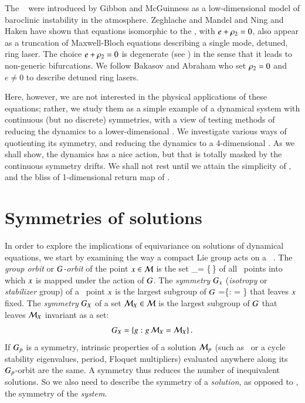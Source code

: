 \documentclass[final,number,sort&compress]{elsarticle}
\begin{document}
The \cLe\  were introduced by
Gibbon and McGuinness as a
low-dim\-ens\-ion\-al model of baroclinic instability in the
atmosphere. Zeghlache and Mandel and
Ning and Haken have shown that
equations isomorphic to the \cLe, with $e+\rho_2=0$,
also appear as a truncation of Maxwell-Bloch equations
describing a single mode, detuned, ring laser. The choice
$e+\rho_2=0$ is degenerate
(see ) in the sense that
it leads to non-generic bifurcations. We follow Bakasov and
Abraham who set $\rho_2=0$ and $e \neq
0$ to describe detuned ring lasers.

Here, however, we are not interested in the physical
applications of these equations; rather, we study them as a
simple example of a dynamical system with continuous (but no
discrete) symmetries, with a view of testing methods of
reducing the dynamics to a lower-dimensional \reducedsp.
We investigate
various ways of quotienting its  symmetry, and
reducing the dynamics to a 4-dim\-ens\-ion\-al \reducedsp. As
we shall show, the dynamics has a nice {\stretchf}
action, but that is totally masked by the continuous symmetry
drifts. We shall not rest until we attain the simplicity of
, and the bliss of 1-dim\-ens\-ion\-al
return map of .


\section{\label{s:symSol} Symmetries of solutions}

In order to explore the implications of equivariance on
solutions of dynamical equations,  we start by examining the
way a compact Lie group acts on a \statesp\ \pS. The
\emph{group orbit} or \emph{$G$-orbit} of the point
$x \in {\cal M}$ is the set
\beq
    \pS_\ssp = \{\LieEl\,\ssp \mid \LieEl \in {\Group}\}
of all \statesp\ points into which $\ssp$ is mapped under the
action of $\Group$.
The \emph{symmetry} $\stab{\ssp}$ (\emph{isotropy} or
\emph{stabilizer} group) of a \statesp\ point $\ssp$ is the
largest subgroup of $\Group$
\beq
\stab{\ssp} =\{\LieEl \in \Group: \LieEl \ssp = \ssp \}
that leaves $\ssp$ fixed.
The \emph{symmetry} $\stab{X}$ of a set $\pS_X \in \pS$ is
the largest subgroup  of $\Group$ that leaves $\pS_X$
in\-vari\-ant as a set:
\[
	\stab{X}= \{\LieEl: \LieEl \, \pS_X = \pS_X\}
\,.
\]
If $G_{p}$ is a symmetry, intrinsic properties of a
solution ${\cal M}_p$ (such as \eqv\ or a cycle stability
eigenvalues, period, Floquet multipliers) evaluated anywhere
along its $G_{p}$-orbit are the same. A symmetry thus
reduces the number of inequivalent solutions. So we also need
to describe the symmetry of a \emph{solution}, as opposed to
, the symmetry of the \emph{system}.
\end{document}
